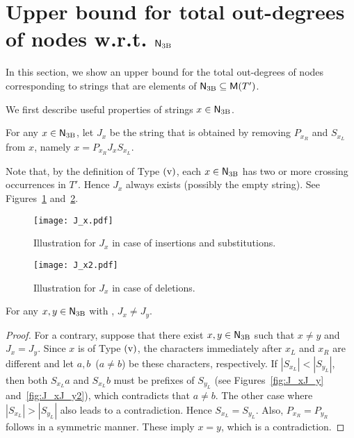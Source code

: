 \section{Upper bound for total out-degrees of nodes w.r.t. $\mathsf{N}_{\mathrm{3B}}$}
\label{sec:upper_bound_3}

In this section, we show an upper bound for the total out-degrees of nodes corresponding to strings that are elements of $\mathsf{N}_{\mathrm{3B}}  \subseteq \mathsf{M}(T')$.

We first describe useful properties of
strings $x \in \mathsf{N}_{\mathrm{3B}}$.

\begin{definition}
    For any $x \in \mathsf{N}_{\mathrm{3B}}$, let $J_x$ be the string that is obtained by removing $P_{x_R}$ and $S_{x_L}$ from $x$, namely $x = P_{x_R} J_x S_{x_L}$.
  \end{definition}

Note that, by the definition of Type $\rm{(v)}$,
each $x \in \mathsf{N}_{\mathrm{3B}}$ has two or more crossing occurrences in $T'$.
Hence $J_x$ always exists (possibly the empty string).
See Figures~\ref{fig:J_x} and~\ref{fig:J_x2}.

  \begin{figure}[H]
    \centering
    \texttt{[image: J\_x.pdf]}
    \caption{Illustration for $J_x$ in case of insertions and substitutions.
    }
    \label{fig:J_x}
  \end{figure}

  \begin{figure}[H]
    \centering
    \texttt{[image: J\_x2.pdf]}
    \caption{Illustration for $J_x$ in case of deletions.}
    \label{fig:J_x2}
  \end{figure}

  \begin{lemma}\label{lem:J_xJ_y}
    For any $x, y \in \mathsf{N}_{\mathrm{3B}}$ with , $J_x \neq J_y$.
  \end{lemma}

  \begin{proof}
    For a contrary, suppose that there exist $x, y \in \mathsf{N}_{\mathrm{3B}}$ such that $x \neq y$ and $J_x = J_y$.
    Since $x$ is of Type $\rm{(v)}$, the characters immediately after $x_L$ and $x_R$ are different and let $a, b$~($a \neq b$) be these characters, respectively.
    If $|S_{x_{L}}|<|S_{y_{L}}|$, then both $S_{x_{L}}a$ and $S_{x_{L}}b$ must be prefixes of $S_{y_{L}}$ (see Figures~\ref{fig:J_xJ_y} and~\ref{fig:J_xJ_y2}), which contradicts that $a \neq b$.
    The other case where $|S_{x_{L}}| > |S_{y_{L}}|$ also leads to a contradiction.
    Hence $S_{x_{L}}=S_{y_{L}}$.
    Also, $P_{x_{R}}=P_{y_{R}}$ follows in a symmetric manner.
    These imply $x=y$, which is a contradiction.
  \end{proof}

